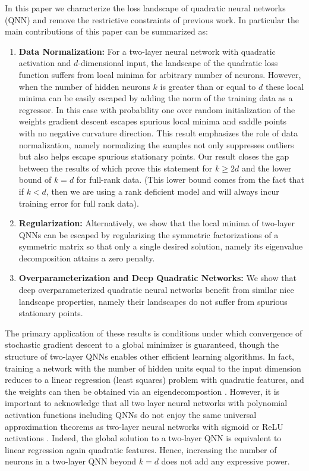 \documentclass[11pt]{article}
\theoremstyle{plain}
\theoremstyle{plain}
\numberwithin{equation}{section}
\numberwithin{lemma}{section}
\numberwithin{theorem}{section}
\numberwithin{corollary}{section}
\numberwithin{observation}{section}
\numberwithin{definition}{section}
\numberwithin{example}{section}
\begin{document}
In this paper we characterize the loss landscape of quadratic neural networks (QNN) and remove the restrictive constraints of previous work. In particular the main contributions of this paper can be summarized as:
\begin{enumerate}[leftmargin=0.7cm]
    \item \textbf{Data Normalization:} For a two-layer neural network with quadratic activation and $d$-dimensional input, the landscape of the quadratic loss function suffers from local minima for arbitrary number of neurons. However, when the number of hidden neurons $k$ is greater than or equal to $d$ these local minima can be easily escaped by adding the norm of the training data as a regressor. In this case with probability one over random initialization of the weights gradient descent escapes spurious local minima and saddle points with no negative curvature direction. This result emphasizes the role of data normalization, namely normalizing the samples not only suppresses outliers but also helps escape spurious stationary points. Our result closes the gap between the results of \cite{JS19} which prove this statement for $k \geq 2d$ and the lower bound of $k = d$ for full-rank data.  (This lower bound comes from the fact that if $k < d$, then we are using a rank deficient model and will always incur training error for full rank data).
    
    \item \textbf{Regularization:} Alternatively, we show that the local minima of two-layer QNNs can be escaped by regularizing the symmetric factorizations of a symmetric matrix so that only a single desired solution, namely its eigenvalue decomposition attains a zero penalty.
    
    \item \textbf{Overparameterization and Deep Quadratic Networks:} We show that deep overparameterized quadratic neural networks benefit from similar nice landscape properties, namely their landscapes do not suffer from spurious stationary points.
    
\end{enumerate}

The primary application of these results is conditions under which convergence of stochastic gradient descent to a global minimizer is guaranteed, though the structure of two-layer QNNs enables other efficient learning algorithms. In fact, training a network with the number of hidden units equal to the input dimension reduces to a linear regression (least squares) problem with quadratic features, and the weights can then be obtained via an eigendecompostion \cite{cheng2018polynomial}.  However, it is important to acknowledge that all two layer neural networks with polynomial activation functions including QNNs do not enjoy the same universal approximation theorems as two-layer neural networks with sigmoid or ReLU activations \cite{hornik91, lu2017expressive}. Indeed, the global solution to a two-layer QNN is equivalent to linear regression again quadratic features. Hence, increasing the number of neurons in a two-layer QNN beyond $k = d$ does not add any expressive power.  
\end{document}
